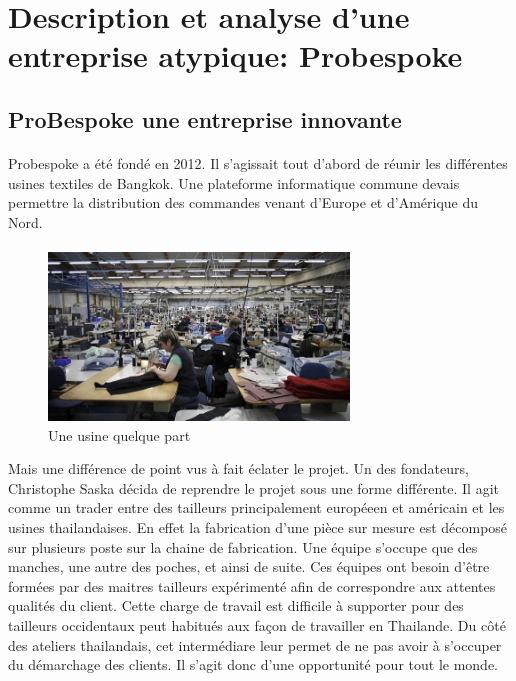 \section{Description et analyse d'une entreprise atypique: Probespoke}
\subsection{ProBespoke une entreprise innovante}

\paragraph{}
Probespoke a été fondé en 2012. Il s'agissait tout d'abord de réunir les différentes usines textiles de Bangkok.
Une plateforme informatique commune devais permettre la distribution des commandes venant d'Europe et d'Amérique du Nord.
\paragraph{}
\begin{figure}
\includegraphics[width=8cm]{image/textile.jpg}
\caption{Une usine quelque part}
\end{figure}
Mais une différence de point vus à fait éclater le projet. Un des fondateurs, Christophe Saska décida de reprendre le projet sous une forme différente. Il agit comme un trader entre des tailleurs principalement européeen et américain et les usines thailandaises. En effet la fabrication d'une pièce sur mesure est décomposé sur plusieurs poste sur la chaine de fabrication. Une équipe s'occupe que des manches, une autre des poches, et ainsi de suite. Ces équipes ont besoin d'être formées par des maitres tailleurs expérimenté afin de correspondre aux attentes qualités du client. Cette charge de travail est difficile à supporter pour des tailleurs occidentaux peut habitués aux façon de travailler en Thailande. Du côté des ateliers thailandais, cet intermédiare leur permet de ne pas avoir à s'occuper du démarchage des clients. Il s'agit donc d'une opportunité pour tout le monde.
